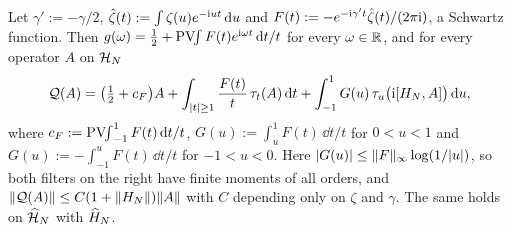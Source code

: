\begin{lemma}\label{lem:timerep}
Let $\gamma':=-\gamma/2$, $\hat\zeta(t):=\int\zeta(u)e^{-\mathrm{i} ut}\,\mathrm{d} u$ and $F(t):=-e^{-\mathrm{i}\gamma't}\hat\zeta(t)/(2\pi\mathrm{i})$, a
Schwartz function. Then $g(\omega)=\tfrac12+\operatorname*{PV\!\!\int} F(t)e^{\mathrm{i}\omega t}\,\mathrm{d} t/t$ for every $\omega\in\mathbb{R}$, and for every
operator $A$ on $\mathcal{H}_N$
\[
\mathcal{Q}(A)=\bigl(\tfrac12+c_F\bigr)A+\int_{\lvert t\rvert\ge1}\frac{F(t)}t\,\tau_t(A)\,\mathrm{d} t+\int_{-1}^1G(u)\,\tau_u\bigl(\mathrm{i}[H_N,A]\bigr)\,\mathrm{d} u,
\]
where $c_F:=\operatorname*{PV\!\!\int}_{-1}^{1}F(t)\,\mathrm{d} t/t$, $G(u):=\int_u^1F(t)\,\dd t/t$ for $0<u<1$ and $G(u):=-\int_{-1}^uF(t)\,\dd t/t$ for
$-1<u<0$. Here $\lvert G(u)\rvert\le\lVert F\rVert_\infty\log(1/\lvert u\rvert)$, so both filters on the right have finite moments of all
orders, and $\lVert\mathcal{Q}(A)\rVert\le C(1+\lVert H_N\rVert)\lVert A\rVert$ with $C$ depending only on $\zeta$ and $\gamma$. The same holds on
$\widehat{\mathcal{H}}_N$ with $\widehat{H}_N$.
\end{lemma}

